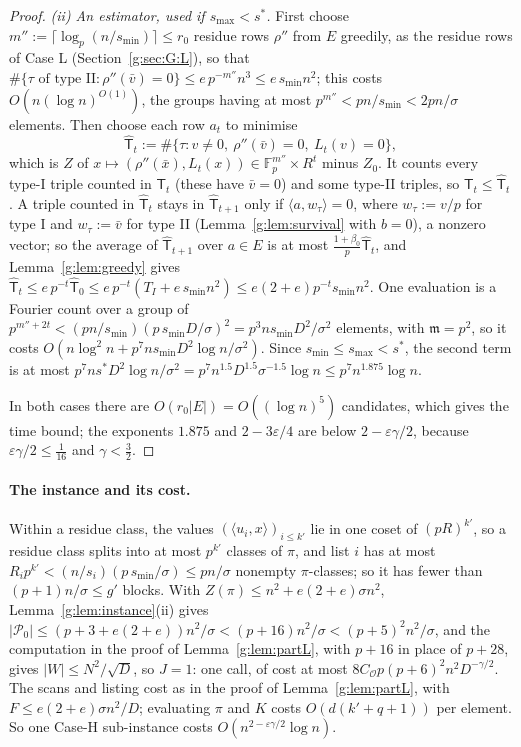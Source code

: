 \documentclass[11pt]{article}
\theoremstyle{definition}
\theoremstyle{remark}
\newcommand{\Fp}{\mathbb{F}_p}
\newcommand{\eps}{\varepsilon}
\newcommand{\Pq}{\mathcal{P}}
\begin{document}
\begin{proof}
\emph{(ii) An estimator, used if $s_{\max}<s^*$.} First choose $m'':=\lceil\log_p(n/s_{\min})\rceil\le r_0$ residue rows $\rho''$ from $E$ greedily, as the residue rows of Case L (Section~\ref{g:sec:G:L}), so that $\#\{\tau\text{ of type II}:\rho''(\bar v)=0\}\le e\,p^{-m''}n^3\le e\,s_{\min}n^2$; this costs $O(n(\log n)^{O(1)})$, the groups having at most $p^{m''}<pn/s_{\min}<2pn/\sigma$ elements. Then choose each row $a_t$ to minimise
\[
\hat{\mathsf T}_t:=\#\{\tau:v\ne0,\ \rho''(\bar v)=0,\ L_t(v)=0\},
\]
which is $Z$ of $x\mapsto(\rho''(\bar x),L_t(x))\in\Fp^{m''}\times R^t$ minus $Z_0$. It counts every type-I triple counted in $\mathsf T_t$ (these have $\bar v=0$) and some type-II triples, so $\mathsf T_t\le\hat{\mathsf T}_t$. A triple counted in $\hat{\mathsf T}_t$ stays in $\hat{\mathsf T}_{t+1}$ only if $\langle a,w_\tau\rangle=0$, where $w_\tau:=v/p$ for type I and $w_\tau:=\bar v$ for type II (Lemma~\ref{g:lem:survival} with $b=0$), a nonzero vector; so the average of $\hat{\mathsf T}_{t+1}$ over $a\in E$ is at most $\frac{1+\beta_0}p\hat{\mathsf T}_t$, and Lemma~\ref{g:lem:greedy} gives $\hat{\mathsf T}_t\le e\,p^{-t}\hat{\mathsf T}_0\le e\,p^{-t}(T_I+e\,s_{\min}n^2)\le e(2+e)p^{-t}s_{\min}n^2$. One evaluation is a Fourier count over a group of $p^{m''+2t}<(pn/s_{\min})(p\,s_{\min}D/\sigma)^2=p^3ns_{\min}D^2/\sigma^2$ elements, with $\mathfrak m=p^2$, so it costs $O(n\log^2n+p^7ns_{\min}D^2\log n/\sigma^2)$. Since $s_{\min}\le s_{\max}<s^*$, the second term is at most $p^7ns^*D^2\log n/\sigma^2=p^7n^{1.5}D^{1.5}\sigma^{-1.5}\log n\le p^7n^{1.875}\log n$.

In both cases there are $O(r_0|E|)=O((\log n)^5)$ candidates, which gives the time bound; the exponents $1.875$ and $2-3\eps/4$ are below $2-\eps\gamma/2$, because $\eps\gamma/2\le\frac1{16}$ and $\gamma<\frac32$.
\end{proof}

\paragraph{The instance and its cost.} Within a residue class, the values $(\langle u_i,x\rangle)_{i\le k'}$ lie in one coset of $(pR)^{k'}$, so a residue class splits into at most $p^{k'}$ classes of $\pi$, and list $i$ has at most $R_ip^{k'}<(n/s_i)(p\,s_{\min}/\sigma)\le pn/\sigma$ nonempty $\pi$-classes; so it has fewer than $(p+1)n/\sigma\le g'$ blocks. With $Z(\pi)\le n^2+e(2+e)\sigma n^2$, Lemma~\ref{g:lem:instance}(ii) gives $|\Pq_0|\le(p+3+e(2+e))n^2/\sigma<(p+16)n^2/\sigma<(p+5)^2n^2/\sigma$, and the computation in the proof of Lemma~\ref{g:lem:partL}, with $p+16$ in place of $p+28$, gives $|W|\le N^2/\sqrt D$, so $J=1$: one call, of cost at most $8C_{\mathcal O}p(p+6)^2n^2D^{-\gamma/2}$. The scans and listing cost as in the proof of Lemma~\ref{g:lem:partL}, with $F\le e(2+e)\sigma n^2/D$; evaluating $\pi$ and $K$ costs $O(d(k'+q+1))$ per element. So one Case-H sub-instance costs $O(n^{2-\eps\gamma/2}\log n)$.
\end{document}
